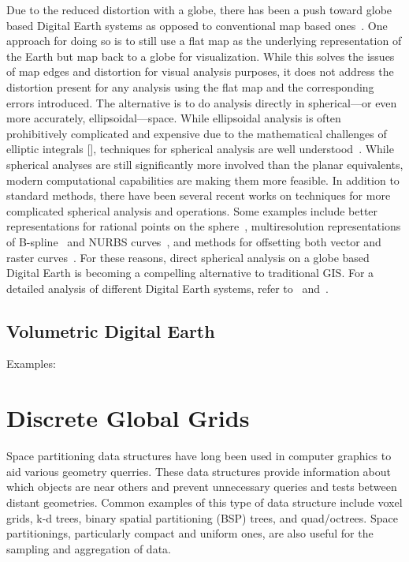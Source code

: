 Due to the reduced distortion with a globe, there has been a push toward globe based Digital Earth systems as opposed to conventional map based ones~\cite{goodchild2018reimagining}.
One approach for doing so is to still use a flat map as the underlying representation of the Earth but map back to a globe for visualization.
While this solves the issues of map edges and distortion for visual analysis purposes, it does not address the distortion present for any analysis using the flat map and the corresponding errors introduced.
The alternative is to do analysis directly in spherical---or even more accurately, ellipsoidal---space.
While ellipsoidal analysis is often prohibitively complicated and expensive due to the mathematical challenges of elliptic integrals [], techniques for spherical analysis are well understood~\cite{raskin1994spatial}.
While spherical analyses are still significantly more involved than the planar equivalents, modern computational capabilities are making them more feasible. 
In addition to standard methods, there have been several recent works on techniques for more complicated spherical analysis and operations.
Some examples include better representations for rational points on the sphere~\cite{bahrdt2017rational}, multiresolution representations of B-spline~\cite{alderson2016multiresolution} and NURBS curves~\cite{alderson2019multiscale}, and methods for offsetting both vector and raster curves~\cite{alderson2018offsetting}.
For these reasons, direct spherical analysis on a globe based Digital Earth is becoming a compelling alternative to traditional GIS. For a detailed analysis of different Digital Earth systems, refer to~\cite{mahdavi2015survey} and~\cite{alderson2020digital}.


\subsection{Volumetric Digital Earth}
Examples: 


\section{Discrete Global Grids}
Space partitioning data structures have long been used in computer graphics to aid various geometry querries.
These data structures provide information about which objects are near others and prevent unnecessary queries and tests between distant geometries.
Common examples of this type of data structure include voxel grids, k-d trees, binary spatial partitioning (BSP) trees, and quad/octrees.
Space partitionings, particularly compact and uniform ones, are also useful for the sampling and aggregation of data. 



